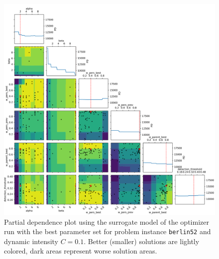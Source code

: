 \begin{figure}[h]
	\centering
	\centerline{\includegraphics[width=1.2\textwidth]{results/part2/partial_dependence_berlin52_C_0.1_run_2.svg}}
	\caption[Partial dependence plot for \texttt{berlin52} and $C=0.1$]{Partial dependence plot using the surrogate model of the optimizer run with the best parameter set for problem instance \texttt{berlin52} and dynamic intensity $C=0.1$. Better (smaller) solutions are lightly colored, dark areas represent worse solution areas.}
	\label{fig:partial_dependence_berlin52_C_01}
\end{figure}

